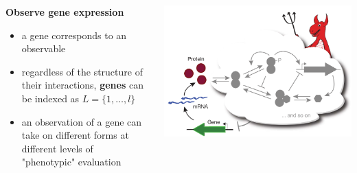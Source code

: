 \begin{frame}
\begin{columns}[c]
\begin{column}{0.5\textwidth}
\begin{block}{\textbf{Observe gene expression}}
\begin{itemize}
\item a gene corresponds to an observable
\item regardless of the structure of their interactions, \textbf{genes} can be indexed as $L = \{1, \ldots, l \}$
\item an observation of a gene can take on different forms at different levels of "phenotypic" evaluation
\end{itemize}
\end{block}
\end{column}
\begin{column}{0.5\textwidth}
\begin{center}
\includegraphics[width=1.0\textwidth]{fig/geneexpressiondemon.png}
\cite{Lestas2010}
\end{center}
\end{column}
\end{columns}
\end{frame}
